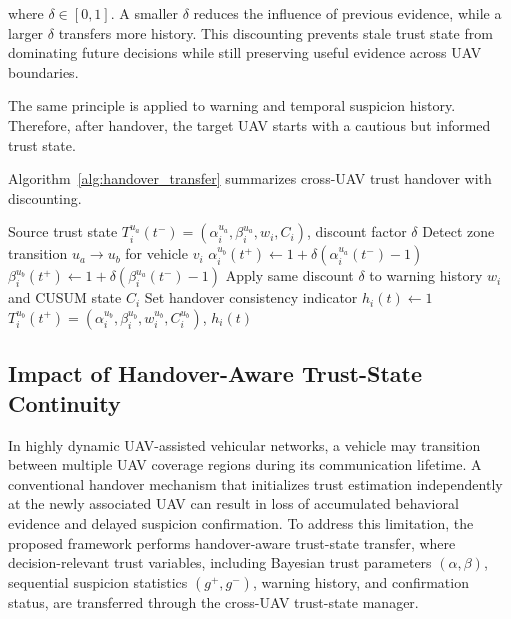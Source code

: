 \documentclass[journal]{IEEEtran}
\begin{document}
where \(\delta\in[0,1]\). A smaller \(\delta\) reduces the influence of previous evidence, while a larger \(\delta\) transfers more history. This discounting prevents stale trust state from dominating future decisions while still preserving useful evidence across UAV boundaries.

The same principle is applied to warning and temporal suspicion history. Therefore, after handover, the target UAV starts with a cautious but informed trust state.

Algorithm~\ref{alg:handover_transfer} summarizes cross-UAV trust handover with discounting.

\begin{algorithm}[!t]
\caption{Cross-UAV Trust Handover with Discounting}
\label{alg:handover_transfer}
\begin{algorithmic}[1]
\REQUIRE Source trust state $T_i^{u_a}(t^-)=(\alpha_i^{u_a},\beta_i^{u_a},w_i,C_i)$, discount factor $\delta$
\STATE Detect zone transition $u_a \rightarrow u_b$ for vehicle $v_i$
\STATE $\alpha_i^{u_b}(t^+) \leftarrow 1+\delta(\alpha_i^{u_a}(t^-)-1)$ 
\STATE $\beta_i^{u_b}(t^+) \leftarrow 1+\delta(\beta_i^{u_a}(t^-)-1)$ 
\STATE Apply same discount $\delta$ to warning history $w_i$ and CUSUM state $C_i$
\STATE Set handover consistency indicator $h_i(t) \leftarrow 1$
\RETURN $T_i^{u_b}(t^+)=(\alpha_i^{u_b},\beta_i^{u_b},w_i^{u_b},C_i^{u_b})$, $h_i(t)$
\end{algorithmic}
\end{algorithm}

\subsection{Impact of Handover-Aware Trust-State Continuity}

In highly dynamic UAV-assisted vehicular networks, a vehicle may transition between multiple UAV coverage regions during its communication lifetime. A conventional handover mechanism that initializes trust estimation independently at the newly associated UAV can result in loss of accumulated behavioral evidence and delayed suspicion confirmation. To address this limitation, the proposed framework performs handover-aware trust-state transfer, where decision-relevant trust variables, including Bayesian trust parameters $(\alpha,\beta)$, sequential suspicion statistics $(g^{+},g^{-})$, warning history, and confirmation status, are transferred through the cross-UAV trust-state manager.
\end{document}
